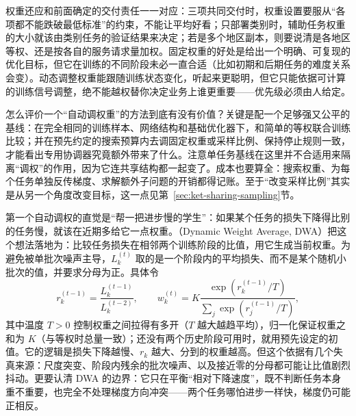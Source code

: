 权重还应和前面确定的交付责任一一对应：三项共同交付时，权重设置要服从“各项都不能跌破最低标准”的约束，不能让平均好看；只部署类别时，辅助任务权重的大小就该由类别任务的验证结果来决定；若是多个地区副本，则要说清是各地区等权、还是按各自的服务请求量加权。固定权重的好处是给出一个明确、可复现的优化目标，但它在训练的不同阶段未必一直合适（比如初期和后期任务的难度关系会变）。动态调整权重能跟随训练状态变化，听起来更聪明，但它只能依据可计算的训练信号调整，绝不能越权替你决定业务上谁更重要——优先级必须由人给定。

怎么评价一个“自动调权重”的方法到底有没有价值？关键是配一个足够强又公平的基线：在完全相同的训练样本、网络结构和基础优化器下，和简单的等权联合训练比较；并在预先约定的搜索预算内去调固定权重或采样比例、保持停止规则一致，才能看出专用协调器究竟额外带来了什么。注意单任务基线在这里并不合适用来隔离“调权”的作用，因为它连共享结构都一起变了。成本也要算全：搜索权重、为每个任务单独反传梯度、求解额外子问题的开销都得记账。至于“改变采样比例”其实是从另一个角度改变目标，这一点见第~\ref{sec:ket-sharing-sampling}节。

第一个自动调权的直觉是“帮一把进步慢的学生”：如果某个任务的损失下降得比别的任务慢，就该在近期多给它一点权重。（Dynamic Weight Average, DWA）把这个想法落地为：比较任务损失在相邻两个训练阶段的比值，用它生成当前权重。为避免被单批次噪声主导，$L_k^{(t)}$ 取的是一个阶段内的平均损失、而不是某个随机小批次的值，并要求分母为正。具体令
\[
  r_k^{(t-1)}=\frac{L_k^{(t-1)}}{L_k^{(t-2)}},
  \qquad
  w_k^{(t)}
  =K\frac{\exp(r_k^{(t-1)}/T)}
          {\sum_j\exp(r_j^{(t-1)}/T)},
\]
其中温度 $T>0$ 控制权重之间拉得有多开（$T$ 越大越趋平均），归一化保证权重之和为 $K$（与等权时总量一致）；还没有两个历史阶段可用时，就用预先设定的初值。它的逻辑是损失下降越慢、$r_k$ 越大、分到的权重越高。但这个依据有几个失真来源：尺度突变、阶段内残余的批次噪声、以及接近零的分母都可能让比值剧烈抖动。更要认清 DWA 的边界：它只在平衡“相对下降速度”，既不判断任务本身重不重要，也完全不处理梯度方向冲突——两个任务哪怕进步一样快，梯度仍可能正相反。

